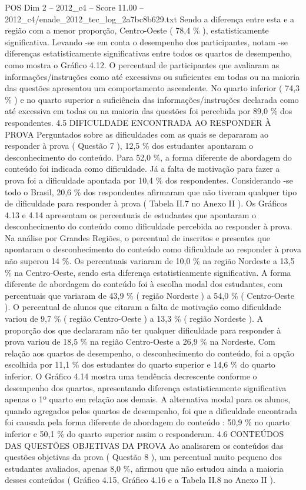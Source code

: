 \begin{textsample}{POS Dim 2 – 2012\_c4 – Score 11.00 – 2012\_c4/enade\_2012\_tec\_log\_2a7bc8b629.txt}
Sendo a diferença entre esta e a região com a menor proporção, Centro-Oeste ( 78,4 \% ), estatisticamente significativa.
Levando -se em conta o desempenho dos participantes, notam -se diferenças estatisticamente significativas entre todos os quartos de desempenho, como mostra o Gráfico 4.12.
O percentual de participantes que avaliaram as informações/instruções como até excessivas ou suficientes em todas ou na maioria das questões apresentou um comportamento ascendente.
No quarto inferior ( 74,3 \% ) e no quarto superior a suficiência das informações/instruções declarada como até excessiva em todas ou na maioria das questões foi percebida por 89,0 \% dos respondentes. 4.5 DIFICULDADE ENCONTRADA AO RESPONDER À PROVA Perguntados sobre as dificuldades com as quais se depararam ao responder à prova ( Questão 7 ), 12,5 \% dos estudantes apontaram o desconhecimento do conteúdo.
Para 52,0 \%, a forma diferente de abordagem do conteúdo foi indicada como dificuldade.
Já a falta de motivação para fazer a prova foi a dificuldade apontada por 10,4 \% dos respondentes.
Considerando -se todo o Brasil, 20,6 \% dos respondentes afirmaram que não tiveram qualquer tipo de dificuldade para responder à prova ( Tabela II.7 no Anexo II ).
Os Gráficos 4.13 e 4.14 apresentam os percentuais de estudantes que apontaram o desconhecimento do conteúdo como dificuldade percebida ao responder à prova.
Na análise por Grandes Regiões, o percentual de inscritos e presentes que apontaram o desconhecimento do conteúdo como dificuldade ao responder à prova não superou 14 \%.
Os percentuais variaram de 10,0 \% na região Nordeste a 13,5 \% na Centro-Oeste, sendo esta diferença estatisticamente significativa.
A forma diferente de abordagem do conteúdo foi à escolha modal dos estudantes, com percentuais que variaram de 43,9 \% ( região Nordeste ) a 54,0 \% ( Centro-Oeste ).
O percentual de alunos que citaram a falta de motivação como dificuldade variou de 9,7 \% ( região Centro-Oeste ) a 13,3 \% ( região Nordeste ).
A proporção dos que declararam não ter qualquer dificuldade para responder à prova variou de 18,5 \% na região Centro-Oeste a 26,9 \% na Nordeste.
Com relação aos quartos de desempenho, o desconhecimento do conteúdo, foi a opção escolhida por 11,1 \% dos estudantes do quarto superior e 14,6 \% do quarto inferior.
O Gráfico 4.14 mostra uma tendência decrescente conforme o desempenho dos quartos, apresentando diferença estatisticamente significativa apenas o 1º quarto em relação aos demais.
A alternativa modal para os alunos, quando agregados pelos quartos de desempenho, foi que a dificuldade encontrada foi causada pela forma diferente de abordagem do conteúdo : 50,9 \% no quarto inferior e 50,1 \% do quarto superior assim o responderam. 4.6 CONTEÚDOS DAS QUESTÕES OBJETIVAS DA PROVA Ao analisarem os conteúdos das questões objetivas da prova ( Questão 8 ), um percentual muito pequeno dos estudantes avaliados, apenas 8,0 \%, afirmou que não estudou ainda a maioria desses conteúdos ( Gráfico 4.15, Gráfico 4.16 e a Tabela II.8 no Anexo II ).

\end{textsample}
